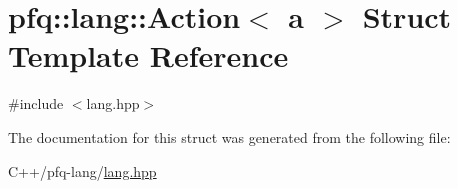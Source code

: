 \hypertarget{structpfq_1_1lang_1_1Action}{\section{pfq\+:\+:lang\+:\+:Action$<$ a $>$ Struct Template Reference}
\label{structpfq_1_1lang_1_1Action}
}


{\ttfamily \#include $<$lang.\+hpp$>$}



The documentation for this struct was generated from the following file\+:\begin{DoxyCompactItemize}
\item 
C++/pfq-\/lang/\hyperlink{lang_8hpp}{lang.\+hpp}\end{DoxyCompactItemize}

